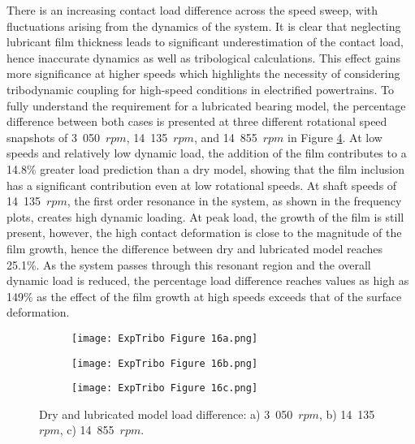 There is an increasing contact load difference across the speed sweep, with fluctuations arising from the dynamics of the system. It is clear that neglecting lubricant film thickness leads to significant underestimation of the contact load, hence inaccurate dynamics as well as tribological calculations. This effect gains more significance at higher speeds which highlights the necessity of considering tribodynamic coupling for high-speed conditions in electrified powertrains. To fully understand the requirement for a lubricated bearing model, the percentage difference between both cases is presented at three different rotational speed snapshots of 3~050~$rpm$, 14~135~$rpm$, and 14~855~$rpm$ in Figure \ref{Dry and lubricated model load difference}. At low speeds and relatively low dynamic load, the addition of the film contributes to a 14.8\% greater load prediction than a dry model, showing that the film inclusion has a significant contribution even at low rotational speeds. At shaft speeds of 14~135~$rpm$, the first order resonance in the system, as shown in the frequency plots, creates high dynamic loading. At peak load, the growth of the film is still present, however, the high contact deformation is close to the magnitude of the film growth, hence the difference between dry and lubricated model reaches 25.1\%. As the system passes through this resonant region and the overall dynamic load is reduced, the percentage load difference reaches values as high as 149\% as the effect of the film growth at high speeds exceeds that of the surface deformation.

\begin{figure}
	\centering
	\begin{subfigure}{0.75\textwidth}
		\centering
		\texttt{[image: ExpTribo Figure 16a.png]}
		\caption{}
		\label{3050rpm}
	\end{subfigure}
	\hfill
	\begin{subfigure}{0.75\textwidth}
		\centering
		\texttt{[image: ExpTribo Figure 16b.png]}
		\caption{}
		\label{14135rpm}
	\end{subfigure}
	\vfill
	\begin{subfigure}{0.75\textwidth}
		\centering
		\texttt{[image: ExpTribo Figure 16c.png]}
		\caption{}
		\label{14855rpm}
	\end{subfigure}
	\caption{Dry and lubricated model load difference: a) 3~050~$rpm$, b) 14~135~$rpm$, c) 14~855~$rpm$.}
	\label{Dry and lubricated model load difference}
\end{figure}

